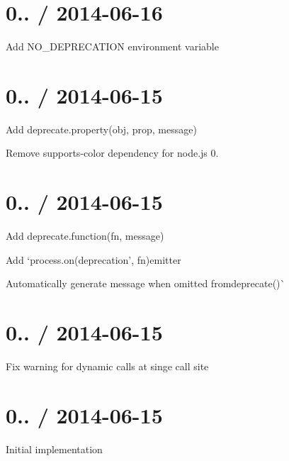 \section*{0.. / 2014-\/06-\/16 }


\begin{DoxyItemize}
\item Add {\ttfamily N\+O\+\_\+\+D\+E\+P\+R\+E\+C\+A\+T\+I\+ON} environment variable
\end{DoxyItemize}

\section*{0.. / 2014-\/06-\/15 }


\begin{DoxyItemize}
\item Add {\ttfamily deprecate.\+property(obj, prop, message)}
\item Remove {\ttfamily supports-\/color} dependency for node.\+js 0.
\end{DoxyItemize}

\section*{0.. / 2014-\/06-\/15 }


\begin{DoxyItemize}
\item Add {\ttfamily deprecate.\+function(fn, message)}
\item Add `process.\+on(\textquotesingle{}deprecation', fn){\ttfamily emitter}
\item {\ttfamily Automatically generate message when omitted from}deprecate()\`{}
\end{DoxyItemize}

\section*{0.. / 2014-\/06-\/15 }


\begin{DoxyItemize}
\item Fix warning for dynamic calls at singe call site
\end{DoxyItemize}

\section*{0.. / 2014-\/06-\/15 }


\begin{DoxyItemize}
\item Initial implementation 
\end{DoxyItemize}